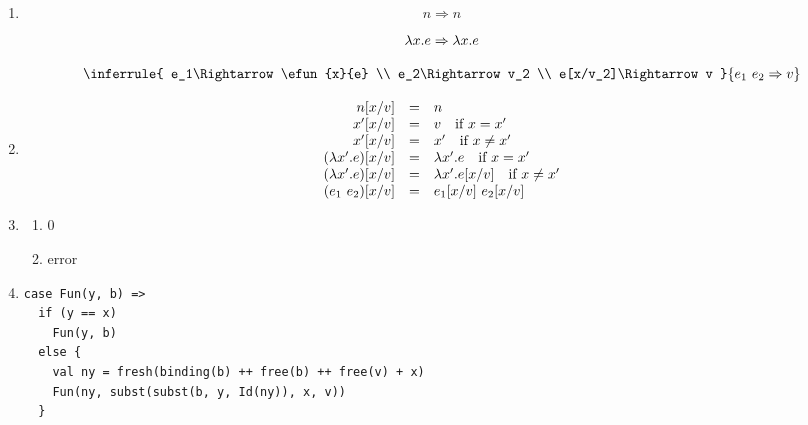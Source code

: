 \textbf{}
\newcommand{\evals}[2]{#1\Rightarrow#2}
\begin{enumerate}
  \item
    \[
      \evals{n}{n}
    \]

    \[
      \evals{\efun{x}{e}}{\efun{x}{e}}
    \]

    \[
      \inferrule
      { \evals{e_1}{\efun{x}{e}} \\
        \evals{e_2}{v_2} \\
        \evals{e[x/v_2]}{v} }
      { \evals{\eapp{e_1}{e_2}}{v} }
    \]
  \item
      \[
        \begin{array}{rcl}
          n[x/v] &=& n \\
          x'[x/v] &=& v \quad \text{if}\ x=x' \\
          x'[x/v] &=& x' \quad \text{if}\ x\not=x' \\
          (\efun{x'}{e})[x/v] &=& \efun{x'}{e} \quad \text{if}\ x=x' \\
          (\efun{x'}{e})[x/v] &=& \efun{x'}{e[x/v]} \quad \text{if}\ x\not=x' \\
          (\eapp{e_1}{e_2})[x/v] &=& \eapp{e_1[x/v]}{e_2[x/v]} \\
        \end{array}
      \]
  \item
    \begin{enumerate}
        \item 0
        \item error
    \end{enumerate}
  \item
\begin{verbatim}
case Fun(y, b) =>
  if (y == x)
    Fun(y, b)
  else {
    val ny = fresh(binding(b) ++ free(b) ++ free(v) + x)
    Fun(ny, subst(subst(b, y, Id(ny)), x, v))
  }
\end{verbatim}
\end{enumerate}

